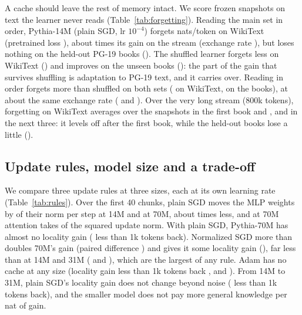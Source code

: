 \documentclass[times,twocolumn,final,authoryear]{elsarticle}
\begin{document}
A cache should leave the rest of memory intact.
We score frozen snapshots on text the learner never reads (Table~\ref{tab:forgetting}).
Reading the main set in order, Pythia-14M (plain SGD, lr $10^{-4}$) forgets \forgetWikiKOnePM{} nats/token on WikiText (pretrained loss \frozenWiki{}), about \wikiOverGainKOne{} times its gain on the stream (exchange rate \exchangeKOne{}), but loses nothing on the held-out PG-19 books (\forgetBooksKOnePM{}).
The shuffled learner forgets less on WikiText (\forgetWikiShuffledPM{}) and improves on the unseen books (\forgetBooksShuffledPM{}): the part of the gain that survives shuffling is adaptation to PG-19 text, and it carries over.
Reading in order forgets more than shuffled on both sets (\shMinusKOneWikiPM{} on WikiText, \shMinusKOneBooksPM{} on the books), at about the same exchange rate (\exchangeKOne{} and \exchangeShuffled{}).
Over the very long stream (800k tokens), forgetting on WikiText averages \veryLongWikiBookOne{} over the snapshots in the first book and \veryLongWikiBookTwo{}, \veryLongWikiBookThree{} and \veryLongWikiBookFour{} in the next three: it levels off after the first book, while the held-out books lose a little (\forgetBooksVeryLongPM{}).

\begin{table}[t]
\caption{Collateral forgetting of held-out text by Pythia-14M with plain SGD on all parameters (lr $10^{-4}$): snapshot loss $-$ pretrained loss, mean over the snapshots in the second half of the stream, $\pm$ SE over the WikiText chunks or the 6 held-out books; positive means knowledge lost. Stream gain: over the frozen loss on the stream, $\pm$ SE over books. Exchange rate = stream gain / forgetting on WikiText. Very long: 4 books of 200k tokens. $\dagger$: under 2 SE.}
\label{tab:forgetting}
\centering\footnotesize\setlength{\tabcolsep}{3pt}

\end{table}

\subsection{Update rules, model size and a trade-off}\label{sec:rules}

We compare three update rules at three sizes, each at its own learning rate (Table~\ref{tab:rules}).
Over the first 40 chunks, plain SGD moves the MLP weights by \relMlpFourteen{} of their norm per step at 14M and \relMlpSeventy{} at 70M, about \mlpStepRatio{} times less, and at 70M attention takes \shareAttnSeventy{} of the squared update norm.
With plain SGD, Pythia-70M has almost no locality gain (\rLocOneKSgdSeventyPM{} less than 1k tokens back).
Normalized SGD more than doubles 70M's gain (paired difference \nsgdMinusSgdGainSeventyPM{}) and gives it some locality gain (\rLocOneKNsgdSeventyPM{}), far less than at 14M and 31M (\rLocOneKNsgdFourteenPM{} and \rLocOneKNsgdThirtyOnePM{}), which are the largest of any rule.
Adam has no cache at any size (locality gain less than 1k tokens back \rLocOneKAdamFourteenPM{}, \rLocOneKAdamThirtyOnePM{} and \rLocOneKAdamSeventyPM{}).
From 14M to 31M, plain SGD's locality gain does not change beyond noise (\locDiffThirtyOneFourteenOneKPM{} less than 1k tokens back), and the smaller model does not pay more general knowledge per nat of gain.
\end{document}
